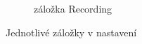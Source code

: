 \begin{figure}[h]
\begin{subfigure}[b]{0.3\textwidth}
        \textcolor{cyan}{\fboxrule=0.5pt\fboxsep=0pt}
        \caption{záložka Recording}
        \label{fig:settings_recording}
    \end{subfigure}
    \caption{Jednotlivé záložky v nastavení}
\label{fig:settings_cards}
\end{figure}


